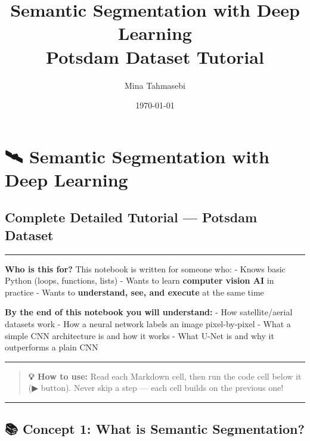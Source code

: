 \documentclass[11pt]{article}
\title{Semantic Segmentation with Deep Learning\\Potsdam Dataset Tutorial}
\author{Mina Tahmasebi}
\date{\today}
\begin{document}
    
    \maketitle
    
    

    
    \section{🛰️ Semantic Segmentation with Deep
Learning}\label{semantic-segmentation-with-deep-learning}

\subsection{Complete Detailed Tutorial --- Potsdam
Dataset}\label{complete-detailed-tutorial-potsdam-dataset}

\begin{center}\rule{0.5\linewidth}{0.5pt}\end{center}

\textbf{Who is this for?} This notebook is written for someone who: -
Knows basic Python (loops, functions, lists) - Wants to learn
\textbf{computer vision AI} in practice - Wants to \textbf{understand,
see, and execute} at the same time

\textbf{By the end of this notebook you will understand:} - How
satellite/aerial datasets work - How a neural network labels an image
pixel-by-pixel - What a simple CNN architecture is and how it works -
What U-Net is and why it outperforms a plain CNN

\begin{center}\rule{0.5\linewidth}{0.5pt}\end{center}

\begin{quote}
\textbf{💡 How to use:} Read each Markdown cell, then run the code cell
below it (▶ button). Never skip a step --- each cell builds on the
previous one!
\end{quote}

    \begin{center}\rule{0.5\linewidth}{0.5pt}\end{center}

\subsection{📚 Concept 1: What is Semantic
Segmentation?}\label{concept-1-what-is-semantic-segmentation}
\end{document}
